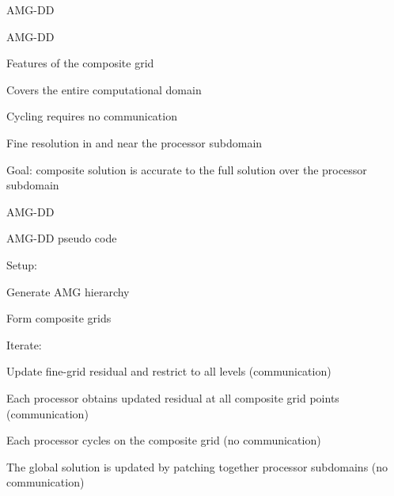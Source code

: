 \documentclass[18pt,xcolor=table]{beamer}
\begin{document}
\begin{frame}{AMG-DD}
\end{frame}

\begin{frame}{AMG-DD}
\begin{block}{Features of the composite grid}
\bit
\item Covers the entire computational domain
\item Cycling requires no communication 
\item Fine resolution in and near the processor subdomain
\item Goal: composite solution is accurate to the full solution over the processor subdomain
\eit
\end{block}
\end{frame}

\begin{frame}{AMG-DD}
\begin{block}{AMG-DD pseudo code}
\bit
\item Setup:
\bit
\item Generate AMG hierarchy
\item Form composite grids
\eit
\item Iterate:
\bit
\item Update fine-grid residual and restrict to all levels (communication)
\item Each processor obtains updated residual at all composite grid points (communication)
\item Each processor cycles on the composite grid (no communication)
\item The global solution is updated by patching together processor subdomains (no communication)
\eit
\eit
\end{block}
\end{frame}
\end{document}
